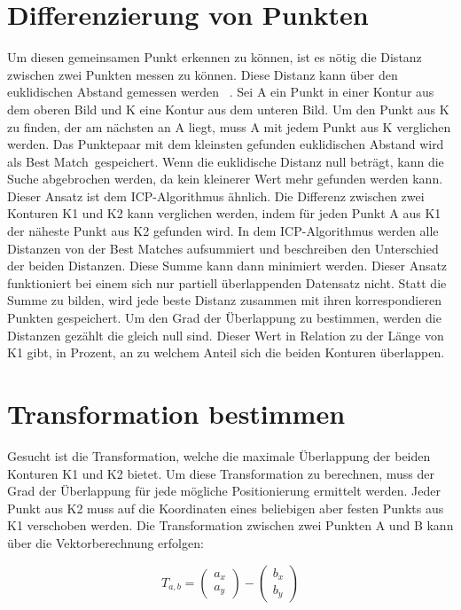 \section{Differenzierung von Punkten}

Um diesen gemeinsamen Punkt erkennen zu können, ist es nötig die Distanz 
zwischen zwei Punkten messen zu können.
Diese Distanz kann über den euklidischen Abstand gemessen werden
~\cite{Dokmanic.2015}. Sei A ein Punkt in einer Kontur aus dem oberen Bild und K eine 
Kontur aus dem unteren Bild.  
Um den Punkt aus K zu finden, der am nächsten an A liegt, muss A mit jedem Punkt aus 
K verglichen werden. Das Punktepaar mit dem kleinsten gefunden euklidischen Abstand 
wird als \glqq Best Match\grqq~gespeichert. Wenn die euklidische Distanz null beträgt, kann 
die Suche abgebrochen werden, da kein kleinerer Wert mehr gefunden werden kann.
Dieser Ansatz ist dem ICP-Algorithmus ähnlich. Die Differenz zwischen zwei Konturen 
K1 und K2 kann verglichen werden, indem für jeden Punkt A aus K1 der näheste Punkt aus 
K2 gefunden wird. In dem ICP-Algorithmus werden alle Distanzen von der \glq Best Matches \grq 
aufsummiert und beschreiben den Unterschied der beiden Distanzen. Diese Summe kann dann 
minimiert werden. Dieser Ansatz funktioniert bei einem sich nur partiell
überlappenden Datensatz nicht. 
Statt die Summe zu bilden, wird jede beste Distanz zusammen mit ihren korrespondieren 
Punkten gespeichert. Um den Grad der Überlappung zu bestimmen, werden die Distanzen 
gezählt die gleich null sind. Dieser Wert in Relation zu der Länge von K1 gibt, 
in Prozent, an zu welchem Anteil sich die beiden Konturen überlappen.

\section{Transformation bestimmen}

Gesucht ist die Transformation, welche die maximale Überlappung der beiden 
Konturen K1 und K2 bietet. Um diese Transformation zu berechnen, muss der 
Grad der Überlappung für jede mögliche Positionierung ermittelt werden. Jeder
Punkt aus K2 muss auf die Koordinaten eines beliebigen aber festen Punkts aus K1 
verschoben werden.
Die Transformation zwischen zwei Punkten A und B kann über die Vektorberechnung erfolgen:

\begin{equation*}
    T_{a,b} = \begin{pmatrix}a_x\\a_y\end{pmatrix} - \begin{pmatrix}b_x\\b_y\end{pmatrix}
\end{equation*}

